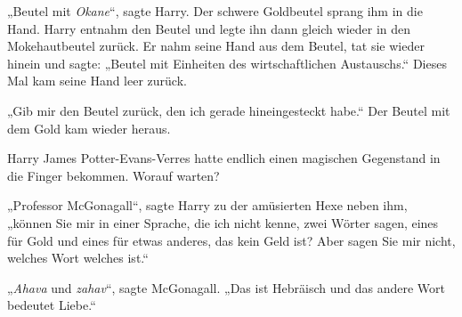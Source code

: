 „Beutel mit \emph{Okane}“, sagte Harry. Der schwere Goldbeutel sprang ihm in die Hand. Harry entnahm den Beutel und legte ihn dann gleich wieder in den Mokehautbeutel zurück. Er nahm seine Hand aus dem Beutel, tat sie wieder hinein und sagte:
„Beutel mit Einheiten des wirtschaftlichen Austauschs.“ Dieses Mal kam seine Hand leer zurück.

„Gib mir den Beutel zurück, den ich gerade hineingesteckt habe.“ Der Beutel mit dem Gold kam wieder heraus.

Harry James Potter-Evans-Verres hatte endlich einen magischen Gegenstand in die Finger bekommen. Worauf warten?

„Professor McGonagall“, sagte Harry zu der amüsierten Hexe neben ihm, „können Sie mir in einer Sprache, die ich nicht kenne, zwei Wörter sagen, eines für Gold und eines für etwas anderes, das kein Geld ist? Aber sagen Sie mir nicht, welches Wort welches ist.“

„\emph{Ahava} und \emph{zahav}“, sagte McGonagall.
„Das ist Hebräisch und das andere Wort bedeutet Liebe.“


